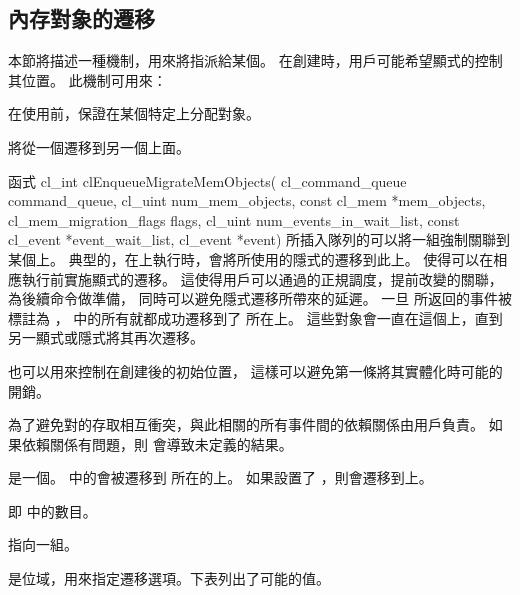 \subsection{內存對象的遷移}

本節將描述一種機制，用來將指派給某個。
在創建時，用戶可能希望顯式的控制其位置。
此機制可用來：
\startigBase
\item 在使用前，保證在某個特定上分配對象。

\item 將從一個遷移到另一個上面。
\stopigBase

函式
\startCLFUNC
cl_int clEnqueueMigrateMemObjects(
			cl_command_queue command_queue,
			cl_uint num_mem_objects,
			const cl_mem *mem_objects,
			cl_mem_migration_flags flags,
			cl_uint num_events_in_wait_list,
			const cl_event *event_wait_list,
			cl_event *event)
\stopCLFUNC
所插入隊列的可以將一組強制關聯到某個上。
典型的，在上執行時，會將所使用的隱式的遷移到此上。
 使得可以在相應執行前實施顯式的遷移。
這使得用戶可以通過的正規調度，提前改變的關聯，為後續命令做準備，
同時可以避免隱式遷移所帶來的延遲。
一旦  所返回的事件被標註為 ，
  中的所有就都成功遷移到了  所在上。
這些對象會一直在這個上，直到另一顯式或隱式將其再次遷移。

 也可以用來控制在創建後的初始位置，
這樣可以避免第一條將其實體化時可能的開銷。

為了避免對的存取相互衝突，與此相關的所有事件間的依賴關係由用戶負責。
如果依賴關係有問題，則  會導致未定義的結果。

 是一個。
  中的會被遷移到  所在的上。
如果設置了 ，則會遷移到上。

 即  中的數目。

 指向一組。

 是位域，用來指定遷移選項。下表列出了可能的值。

{}

